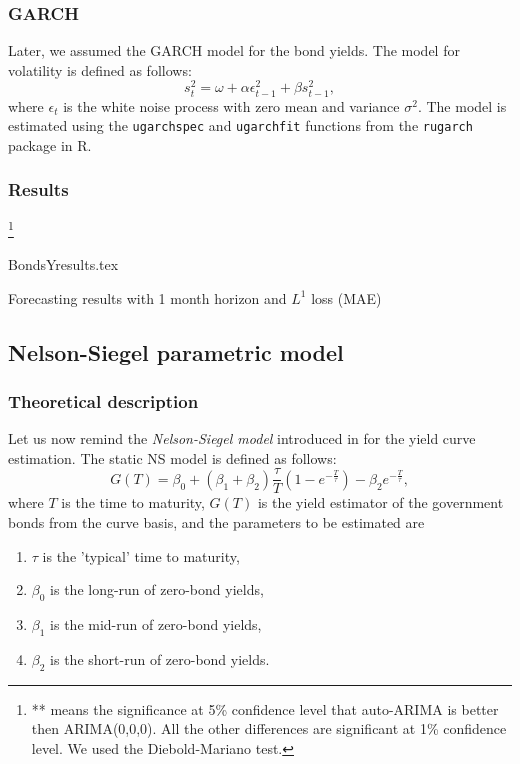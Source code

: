         \subsubsection{GARCH}
            Later, we assumed the GARCH model for the bond yields. The model for volatility is defined as follows:
            \begin{equation}\label{eq:GARCH}
                s_t^2 = \omega + \alpha \epsilon_{t-1}^2 + \beta s_{t-1}^2,
            \end{equation}
            where $\epsilon_t$ is the white noise process with zero mean and variance $\sigma^2$.
            The model is estimated using the \texttt{ugarchspec} and \texttt{ugarchfit} functions from the \texttt{rugarch} package in R.
            
        \subsubsection{Results}\footnote{** means the significance at 5\% confidence level that auto-ARIMA is better then ARIMA(0,0,0). 
        All the other differences are significant at 1\% confidence level. We used the Diebold-Mariano test. } 
        \

            \begin{table}[!htbp]
                {BondsYresults.tex}
                \label{tab:naiveres}
                \caption{Forecasting results with 1 month horizon and $L^1$ loss (MAE)}
            \end{table}

    \subsection{Nelson-Siegel parametric model}
        \subsubsection{Theoretical description}
            Let us now remind the \emph{Nelson-Siegel model} introduced in \cite{Nelson1987} for the yield curve estimation. The 
            static NS model is defined as follows:
            \begin{equation}\label{eq:NS}
                G(T) = \beta_0 + (\beta_1+\beta_2)\frac{\tau}{T}\left(1-e^{-\frac{T}{\tau}}\right)-\beta_2  e^{-\frac{T}{\tau}},
            \end{equation}
            where $T$ is the time to maturity, $G(T)$ is the yield estimator of the government bonds from the curve basis, 
            and the parameters to be estimated are
            \begin{enumerate}
                \item $\tau$ is the 'typical' time to maturity, 
                \item $\beta_0$ is the long-run of zero-bond yields, 
                \item $\beta_1$ is the mid-run of zero-bond yields, 
                \item $\beta_2$ is the short-run of zero-bond yields.
            \end{enumerate}

